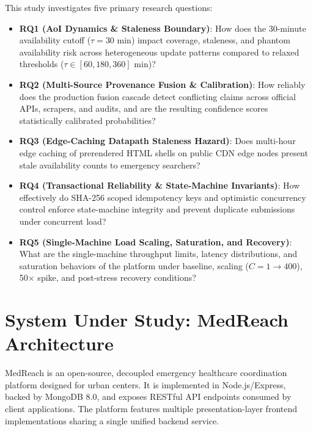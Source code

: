 \documentclass[conference]{IEEEtran}
\begin{document}
This study investigates five primary research questions:
\begin{itemize}
    \item \textbf{RQ1 (AoI Dynamics \& Staleness Boundary)}: How does the 30-minute availability cutoff ($\tau = 30\text{ min}$) impact coverage, staleness, and phantom availability risk across heterogeneous update patterns compared to relaxed thresholds ($\tau \in [60, 180, 360]\text{ min}$)?
    \item \textbf{RQ2 (Multi-Source Provenance Fusion \& Calibration)}: How reliably does the production fusion cascade detect conflicting claims across official APIs, scrapers, and audits, and are the resulting confidence scores statistically calibrated probabilities?
    \item \textbf{RQ3 (Edge-Caching Datapath Staleness Hazard)}: Does multi-hour edge caching of prerendered HTML shells on public CDN edge nodes present stale availability counts to emergency searchers?
    \item \textbf{RQ4 (Transactional Reliability \& State-Machine Invariants)}: How effectively do SHA-256 scoped idempotency keys and optimistic concurrency control enforce state-machine integrity and prevent duplicate submissions under concurrent load?
    \item \textbf{RQ5 (Single-Machine Load Scaling, Saturation, and Recovery)}: What are the single-machine throughput limits, latency distributions, and saturation behaviors of the platform under baseline, scaling ($C=1 \to 400$), 50$\times$ spike, and post-stress recovery conditions?
\end{itemize}

\section{System Under Study: MedReach Architecture}

MedReach is an open-source, decoupled emergency healthcare coordination platform designed for urban centers. It is implemented in Node.js/Express, backed by MongoDB 8.0, and exposes RESTful API endpoints consumed by client applications. The platform features multiple presentation-layer frontend implementations sharing a single unified backend service.
\end{document}
